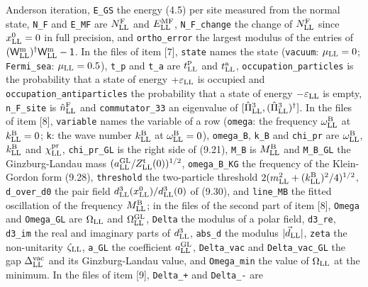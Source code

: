 \documentclass[
  10pt,
]{article}
\begin{document}
Anderson iteration, \texttt{E\_GS} the energy (4.5) per site measured
from the normal state, \texttt{N\_F} and \texttt{E\_MF} are
\(N^{\rm F}_{\rm LL}\) and \(E^{\rm MF}_{\rm LL}\),
\texttt{N\_F\_change} the change of \(N^{\rm F}_{\rm LL}\) since
\(x^0_{\rm LL}=0\) in full precision, and \texttt{ortho\_error} the
largest modulus of the entries of
\((\mathsf W^{\rm m}_{\rm LL})^\dagger\mathsf W^{\rm m}_{\rm LL}-\mathsf 1\).
In the files of item {[}7{]}, \texttt{state} names the state
(\texttt{vacuum}: \(\mu_{\rm LL}=0\); \texttt{Fermi\_sea}:
\(\mu_{\rm LL}=0.5\)), \texttt{t\_p} and \texttt{t\_a} are
\(t^{\rm p}_{\rm LL}\) and \(t^{\rm a}_{\rm LL}\),
\texttt{occupation\_particles} is the probability that a state of energy
\(+\varepsilon_{\rm LL}\) is occupied and
\texttt{occupation\_antiparticles} the probability that a state of
energy \(-\varepsilon_{\rm LL}\) is empty, \texttt{n\_F\_site} is
\(\hat n^{\rm F}_{\rm LL}\) and \texttt{commutator\_33} an eigenvalue of
\([\hat\Pi^3_{\rm LL},(\hat\Pi^3_{\rm LL})^\dagger]\). In the files of
item {[}8{]}, \texttt{variable} names the variable of a row
(\texttt{omega}: the frequency \(\omega^{\rm B}_{\rm LL}\) at
\(k^{\rm B}_{\rm LL}=0\); \texttt{k}: the wave number
\(k^{\rm B}_{\rm LL}\) at \(\omega^{\rm B}_{\rm LL}=0\)),
\texttt{omega\_B}, \texttt{k\_B} and \texttt{chi\_pr} are
\(\omega^{\rm B}_{\rm LL}\), \(k^{\rm B}_{\rm LL}\) and
\(\chi^{\rm pr}_{\rm LL}\), \texttt{chi\_pr\_GL} is the right side of
(9.21), \texttt{M\_B} is \(M^{\rm B}_{\rm LL}\) and \texttt{M\_B\_GL}
the Ginzburg-Landau mass
\((a^{\rm GL}_{\rm LL}/Z^{\rm t}_{\rm LL}(0))^{1/2}\),
\texttt{omega\_B\_KG} the frequency of the Klein-Gordon form (9.28),
\texttt{threshold} the two-particle threshold
\(2(m_{\rm LL}^2+(k^{\rm B}_{\rm LL})^2/4)^{1/2}\), \texttt{d\_over\_d0}
the pair field \(d^3_{\rm LL}(x^0_{\rm LL})/d^3_{\rm LL}(0)\) of (9.30),
and \texttt{line\_MB} the fitted oscillation of the frequency
\(M^{\rm B}_{\rm LL}\); in the files of the second part of item {[}8{]},
\texttt{Omega} and \texttt{Omega\_GL} are \(\Omega_{\rm LL}\) and
\(\Omega^{\rm GL}_{\rm LL}\), \texttt{Delta} the modulus of a polar
field, \texttt{d3\_re}, \texttt{d3\_im} the real and imaginary parts of
\(d^3_{\rm LL}\), \texttt{abs\_d} the modulus
\(\lvert\vec d_{\rm LL}\rvert\), \texttt{zeta} the non-unitarity
\(\zeta_{\rm LL}\), \texttt{a\_GL} the coefficient
\(a^{\rm GL}_{\rm LL}\), \texttt{Delta\_vac} and \texttt{Delta\_vac\_GL}
the gap \(\Delta^{\rm vac}_{\rm LL}\) and its Ginzburg-Landau value, and
\texttt{Omega\_min} the value of \(\Omega_{\rm LL}\) at the minimum. In
the files of item {[}9{]}, \texttt{Delta\_+} and \texttt{Delta\_-} are
\end{document}
